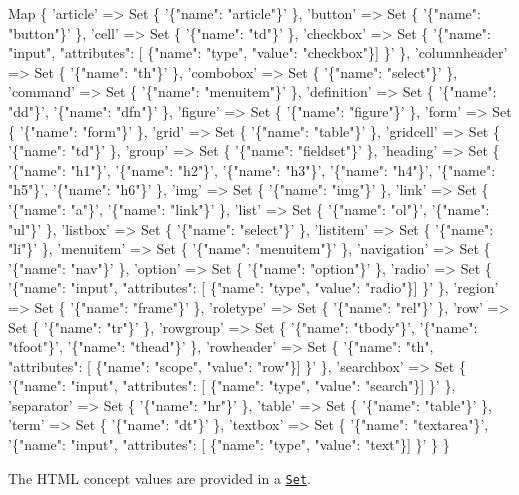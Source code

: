 \begin{DoxyCode}
Map \{
  'article' => Set \{ '\{"name": "article"\}' \},
  'button' => Set \{ '\{"name": "button"\}' \},
  'cell' => Set \{ '\{"name": "td"\}' \},
  'checkbox' => Set \{ '\{"name": "input", "attributes": [ \{"name": "type", "value": "checkbox"\}] \}' \},
  'columnheader' => Set \{ '\{"name": "th"\}' \},
  'combobox' => Set \{ '\{"name": "select"\}' \},
  'command' => Set \{ '\{"name": "menuitem"\}' \},
  'definition' => Set \{ '\{"name": "dd"\}', '\{"name": "dfn"\}' \},
  'figure' => Set \{ '\{"name": "figure"\}' \},
  'form' => Set \{ '\{"name": "form"\}' \},
  'grid' => Set \{ '\{"name": "table"\}' \},
  'gridcell' => Set \{ '\{"name": "td"\}' \},
  'group' => Set \{ '\{"name": "fieldset"\}' \},
  'heading' => Set \{ '\{"name": "h1"\}', '\{"name": "h2"\}', '\{"name": "h3"\}', '\{"name": "h4"\}',  '\{"name":
       "h5"\}', '\{"name": "h6"\}' \},
  'img' => Set \{ '\{"name": "img"\}' \},
  'link' => Set \{ '\{"name": "a"\}', '\{"name": "link"\}' \},
  'list' => Set \{ '\{"name": "ol"\}', '\{"name": "ul"\}' \},
  'listbox' => Set \{ '\{"name": "select"\}' \},
  'listitem' => Set \{ '\{"name": "li"\}' \},
  'menuitem' => Set \{ '\{"name": "menuitem"\}' \},
  'navigation' => Set \{ '\{"name": "nav"\}' \},
  'option' => Set \{ '\{"name": "option"\}' \},
  'radio' => Set \{ '\{"name": "input", "attributes": [ \{"name": "type", "value": "radio"\}] \}' \},
  'region' => Set \{ '\{"name": "frame"\}' \},
  'roletype' => Set \{ '\{"name": "rel"\}' \},
  'row' => Set \{ '\{"name": "tr"\}' \},
  'rowgroup' => Set \{ '\{"name": "tbody"\}', '\{"name": "tfoot"\}', '\{"name": "thead"\}' \},
  'rowheader' => Set \{ '\{"name": "th", "attributes": [ \{"name": "scope", "value": "row"\}] \}' \},
  'searchbox' => Set \{ '\{"name": "input", "attributes": [ \{"name": "type", "value": "search"\}] \}' \},
  'separator' => Set \{ '\{"name": "hr"\}' \},
  'table' => Set \{ '\{"name": "table"\}' \},
  'term' => Set \{ '\{"name": "dt"\}' \},
  'textbox' => Set \{ '\{"name": "textarea"\}', '\{"name": "input", "attributes": [ \{"name": "type", "value":
       "text"\}] \}' \}
\}
\end{DoxyCode}


The H\+T\+ML concept values are provided in a \href{https://developer.mozilla.org/en-US/docs/Web/JavaScript/Reference/Global_Objects/Set}{\tt Set}. 